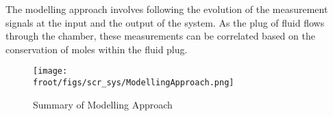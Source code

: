 The modelling approach involves following the evolution of the measurement signals at the input and the output of the
system. As the plug of fluid flows through the chamber, these measurements can be correlated based on the conservation
of moles within the fluid plug.


\begin{figure}[H]
    \centering
    \texttt{[image: \\froot/figs/scr\_sys/ModellingApproach.png]}
    \caption{Summary of Modelling Approach}
\end{figure}
